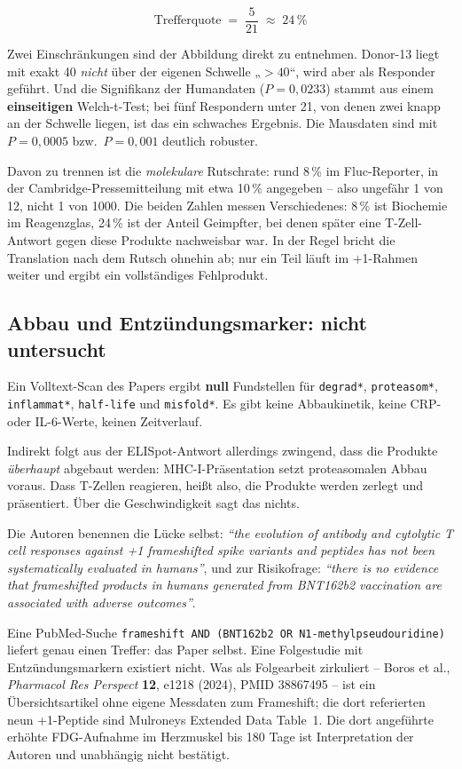 \documentclass[11pt,a4paper]{article}
\begin{document}
\[
\text{Trefferquote} \;=\; \frac{5}{21} \;\approx\; 24\,\%
\]

Zwei Einschränkungen sind der Abbildung direkt zu entnehmen. Donor-13 liegt mit
exakt 40 \emph{nicht} über der eigenen Schwelle „$> 40$``, wird aber als
Responder geführt. Und die Signifikanz der Humandaten ($P = 0{,}0233$) stammt
aus einem \textbf{einseitigen} Welch-t-Test; bei fünf Respondern unter 21, von
denen zwei knapp an der Schwelle liegen, ist das ein schwaches Ergebnis. Die
Mausdaten sind mit $P = 0{,}0005$ bzw.\ $P = 0{,}001$ deutlich robuster.

Davon zu trennen ist die \emph{molekulare} Rutschrate: rund 8\,\% im
Fluc-Reporter, in der Cambridge-Pressemitteilung mit etwa 10\,\% angegeben --
also ungefähr 1 von 12, nicht 1 von 1000. Die beiden Zahlen messen
Verschiedenes: 8\,\% ist Biochemie im Reagenzglas, 24\,\% ist der Anteil
Geimpfter, bei denen später eine T-Zell-Antwort gegen diese Produkte
nachweisbar war. In der Regel bricht die Translation nach dem Rutsch ohnehin
ab; nur ein Teil läuft im +1-Rahmen weiter und ergibt ein vollständiges
Fehlprodukt.

\subsection{Abbau und Entzündungsmarker: nicht untersucht}

Ein Volltext-Scan des Papers ergibt \textbf{null} Fundstellen für
\texttt{degrad*}, \texttt{proteasom*}, \texttt{inflammat*}, \texttt{half-life}
und \texttt{misfold*}. Es gibt keine Abbaukinetik, keine CRP- oder IL-6-Werte,
keinen Zeitverlauf.

Indirekt folgt aus der ELISpot-Antwort allerdings zwingend, dass die Produkte
\emph{überhaupt} abgebaut werden: MHC-I-Präsentation setzt proteasomalen Abbau
voraus. Dass T-Zellen reagieren, heißt also, die Produkte werden zerlegt und
präsentiert. Über die Geschwindigkeit sagt das nichts.

Die Autoren benennen die Lücke selbst: \emph{``the evolution of antibody and
cytolytic T cell responses against +1 frameshifted spike variants and peptides
has not been systematically evaluated in humans''}, und zur Risikofrage:
\emph{``there is no evidence that frameshifted products in humans generated
from BNT162b2 vaccination are associated with adverse outcomes''}.

Eine PubMed-Suche \texttt{frameshift AND (BNT162b2 OR N1-methylpseudouridine)}
liefert genau einen Treffer: das Paper selbst. Eine Folgestudie mit
Entzündungsmarkern existiert nicht. Was als Folgearbeit zirkuliert -- Boros et
al., \emph{Pharmacol Res Perspect} \textbf{12}, e1218 (2024), PMID 38867495 --
ist ein Übersichtsartikel ohne eigene Messdaten zum Frameshift; die dort
referierten neun +1-Peptide sind Mulroneys Extended Data Table~1. Die dort
angeführte erhöhte FDG-Aufnahme im Herzmuskel bis 180 Tage ist Interpretation
der Autoren und unabhängig nicht bestätigt.
\end{document}
